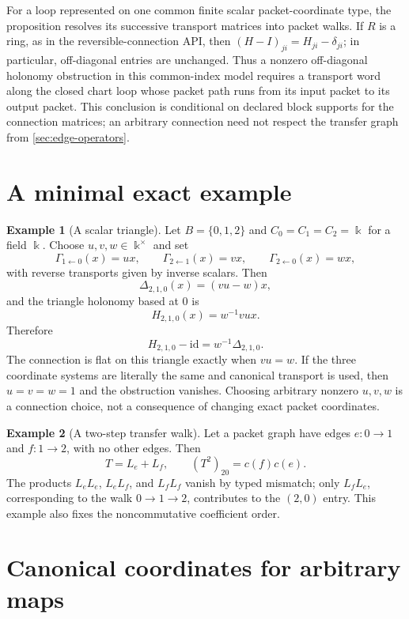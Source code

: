 \documentclass[11pt,a4paper]{article}
\theoremstyle{plain}
\theoremstyle{definition}
\newtheorem{example}[example]{Example}
\theoremstyle{remark}
\newcommand{\bbk}{\Bbbk}
\newcommand{\id}{\mathrm{id}}
\begin{document}
For a loop represented on one common finite scalar packet-coordinate type,
the proposition resolves its successive transport matrices into packet
walks.  If $R$ is a ring, as in the reversible-connection API, then
$(H-I)_{ji}=H_{ji}-\delta_{ji}$; in particular, off-diagonal entries are
unchanged.  Thus a nonzero off-diagonal holonomy obstruction in this
common-index model requires a transport word along the closed chart loop
whose packet path runs from its input packet to its output packet.  This
conclusion is conditional on declared block supports for the connection
matrices; an arbitrary connection need not respect the transfer graph from
\cref{sec:edge-operators}.

\section{A minimal exact example}
\label{sec:example}

\begin{example}[A scalar triangle]
Let $B=\{0,1,2\}$ and $C_0=C_1=C_2=\bbk$ for a field $\bbk$.  Choose
$u,v,w\in\bbk^\times$ and set
\[
\Gamma_{1\leftarrow0}(x)=ux,\qquad
\Gamma_{2\leftarrow1}(x)=vx,\qquad
\Gamma_{2\leftarrow0}(x)=wx,
\]
with reverse transports given by inverse scalars.  Then
\[
\Delta_{2,1,0}(x)=(vu-w)x,
\]
and the triangle holonomy based at $0$ is
\[
H_{2,1,0}(x)=w^{-1}vux.
\]
Therefore
\[
H_{2,1,0}-\id
=w^{-1}\Delta_{2,1,0}.
\]
The connection is flat on this triangle exactly when $vu=w$.  If the three
coordinate systems are literally the same and canonical transport is used,
then $u=v=w=1$ and the obstruction vanishes.  Choosing arbitrary nonzero
$u,v,w$ is a connection choice, not a consequence of changing exact packet
coordinates.
\end{example}

\begin{example}[A two-step transfer walk]
Let a packet graph have edges $e:0\to1$ and $f:1\to2$, with no other edges.
Then
\[
T=L_e+L_f,\qquad
(T^2)_{20}=c(f)c(e).
\]
The products $L_eL_e$, $L_eL_f$, and $L_fL_f$ vanish by typed mismatch;
only $L_fL_e$, corresponding to the walk $0\to1\to2$, contributes to the
$(2,0)$ entry.  This example also fixes the noncommutative coefficient order.
\end{example}

\section{Canonical coordinates for arbitrary maps}
\label{sec:arbitrary-maps}
\end{document}
